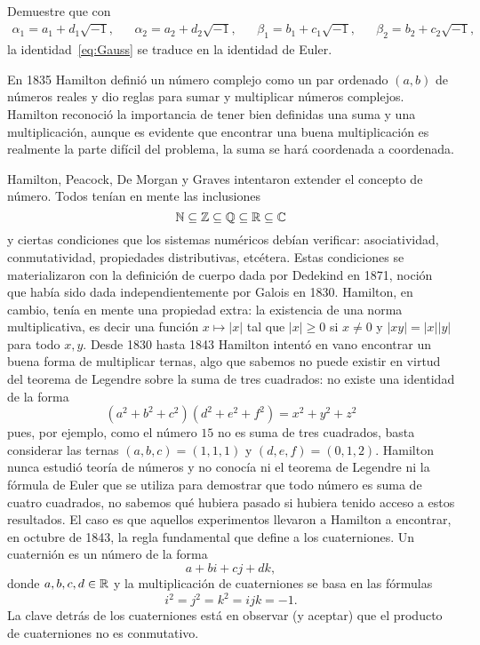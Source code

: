 \begin{exercise}
	Demuestre que con 
	\begin{align*}
		\alpha_1=a_1+d_1\sqrt{-1},
		&&
		\alpha_2=a_2+d_2\sqrt{-1},
		&&
		\beta_1=b_1+c_1\sqrt{-1}, 
		&&
		\beta_2=b_2+c_2\sqrt{-1},
	\end{align*}
	la identidad~\eqref{eq:Gauss} se traduce en la identidad de Euler. 
\end{exercise}

En 1835 Hamilton definió un número complejo como un par ordenado $(a,b)$ de
números reales y dio reglas para sumar y multiplicar números complejos.
Hamilton reconoció la importancia de tener bien definidas una suma y una
multiplicación, aunque es evidente que encontrar una buena multiplicación es
realmente la parte difícil del problema, la suma se hará coordenada a
coordenada. 

Hamilton, Peacock, De Morgan y Graves intentaron extender el concepto de
número. Todos tenían en mente las inclusiones
\[
	\mathbb{N}\subseteq\mathbb{Z}\subseteq\mathbb{Q}\subseteq\mathbb{R}\subseteq\mathbb{C}
\]
y ciertas condiciones que los sistemas numéricos debían verificar:
asociatividad, conmutatividad, propiedades distributivas, etcétera. Estas
condiciones se materializaron con la definición de cuerpo dada por Dedekind en
1871, noción que había sido dada independientemente por Galois en 1830.
Hamilton, en cambio, tenía en mente una propiedad extra: la existencia de una
norma multiplicativa, es decir una función $x\mapsto |x|$ tal que $|x|\geq0$ si
$x\ne 0$ y $|xy|=|x||y|$ para todo $x,y$.  Desde 1830 hasta 1843 Hamilton intentó en
vano encontrar un buena forma de multiplicar ternas, algo que sabemos no puede existir en
virtud del teorema de Legendre sobre la suma de tres cuadrados: no existe 
una identidad de la forma
\[
	(a^2+b^2+c^2)(d^2+e^2+f^2)=x^2+y^2+z^2
\]
pues, por ejemplo, como el número $15$ no es suma de tres cuadrados, basta
considerar las ternas $(a,b,c)=(1,1,1)$ y $(d,e,f)=(0,1,2)$. Hamilton nunca
estudió teoría de números y no conocía ni el teorema de Legendre ni la fórmula
de Euler que se utiliza para demostrar que todo número es suma de cuatro
cuadrados, no sabemos qué hubiera pasado si hubiera tenido acceso a estos
resultados.  El caso es que aquellos experimentos llevaron a Hamilton a
encontrar, en octubre de 1843, la regla fundamental que define a los
cuaterniones. Un cuaternión es un número de la forma 
\[
	a+bi+cj+dk,
\]
donde $a,b,c,d\in\mathbb{R}$ y la multiplicación de cuaterniones se basa en las
fórmulas 
\[
	i^2=j^2=k^2=ijk=-1.
\]
La clave detrás de los cuaterniones está en observar (y aceptar) que el producto de
cuaterniones no es conmutativo. 


